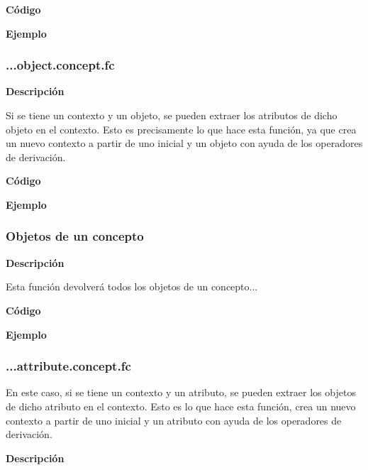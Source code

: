        \textbf{C\'odigo}

        

        


        \textbf{Ejemplo}



    \subsubsection{...object.concept.fc}

    
        \textbf{Descripci\'on}

        Si se tiene un contexto y un objeto, se pueden extraer los atributos de dicho objeto en el contexto. Esto es precisamente lo que hace 
        esta funci\'on, ya que crea un nuevo contexto a partir de uno inicial y un objeto con ayuda de los operadores de derivaci\'on.


        \textbf{C\'odigo}

        


        \textbf{Ejemplo}



    \subsubsection{Objetos de un concepto}

    
        \textbf{Descripci\'on}

        Esta funci\'on devolver\'a todos los objetos de un concepto...


        \textbf{C\'odigo}

        


        \textbf{Ejemplo}



    \subsubsection{...attribute.concept.fc}

        En este caso, si se tiene un contexto y un atributo, se pueden extraer los objetos de dicho atributo en el contexto. 
        Esto es lo que hace esta funci\'on, crea un nuevo contexto a partir de uno inicial y un atributo con ayuda de los operadores 
        de derivaci\'on.
    
        \textbf{Descripci\'on}


